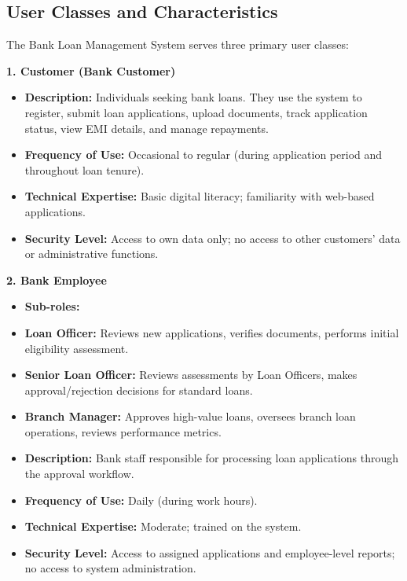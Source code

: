 \subsection{User Classes and Characteristics}

The Bank Loan Management System serves three primary user classes:

\textbf{1. Customer (Bank Customer)}

\begin{itemize}
  \item \textbf{Description:} Individuals seeking bank loans. They use the system to register, submit loan applications, upload documents, track application status, view EMI details, and manage repayments.
  \item \textbf{Frequency of Use:} Occasional to regular (during application period and throughout loan tenure).
  \item \textbf{Technical Expertise:} Basic digital literacy; familiarity with web-based applications.
  \item \textbf{Security Level:} Access to own data only; no access to other customers' data or administrative functions.
\end{itemize}

\textbf{2. Bank Employee}

\begin{itemize}
  \item \textbf{Sub-roles:}
  \item \textbf{Loan Officer:} Reviews new applications, verifies documents, performs initial eligibility assessment.
  \item \textbf{Senior Loan Officer:} Reviews assessments by Loan Officers, makes approval/rejection decisions for standard loans.
  \item \textbf{Branch Manager:} Approves high-value loans, oversees branch loan operations, reviews performance metrics.
  \item \textbf{Description:} Bank staff responsible for processing loan applications through the approval workflow.
  \item \textbf{Frequency of Use:} Daily (during work hours).
  \item \textbf{Technical Expertise:} Moderate; trained on the system.
  \item \textbf{Security Level:} Access to assigned applications and employee-level reports; no access to system administration.
\end{itemize}

